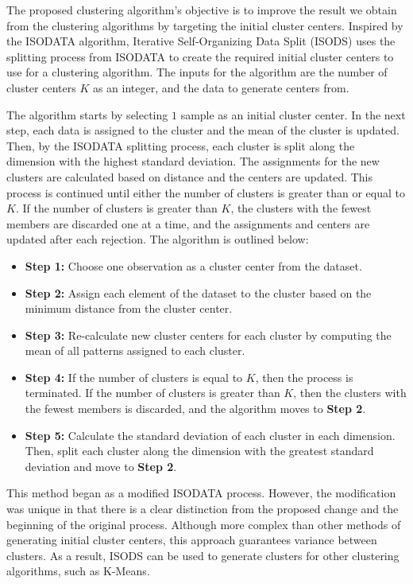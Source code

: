 \documentclass[a4paper, 10pt]{article}
\begin{document}
The proposed clustering algorithm's objective is to improve the result we obtain
from the clustering algorithms by targeting the initial cluster centers.
Inspired by the ISODATA algorithm, Iterative Self-Organizing Data Split (ISODS)
uses the splitting process from ISODATA to create the required initial cluster
centers to use for a clustering algorithm. The inputs for the algorithm are the
number of cluster centers $K$ as an integer, and the data to generate centers
from. 

The algorithm starts by selecting $1$ sample as an initial cluster center. In
the next step, each data is assigned to the cluster and the mean of the cluster
is updated. Then, by the ISODATA splitting process, each cluster is split along
the dimension with the highest standard deviation. The assignments for the new
clusters are calculated based on distance and the centers are updated. This
process is continued until either the number of clusters is greater than or
equal to $K$. If the number of clusters is greater than $K$, the clusters with
the fewest members are discarded one at a time, and the assignments and centers
are updated after each rejection. The algorithm is outlined below:

\begin{itemize}
      \item \textbf{Step 1:} Choose one observation as a cluster center from the
            dataset.
      \item \textbf{Step 2:} Assign each element of the dataset to the cluster
            based on the minimum distance from the cluster center.
      \item \textbf{Step 3:} Re-calculate new cluster centers for each cluster
            by computing the mean of all patterns assigned to each cluster.
      \item \textbf{Step 4:} If the number of clusters is equal to $K$, then the
            process is terminated. If the number of clusters is greater than
            $K$, then the clusters with the fewest members is discarded, and the
            algorithm moves to \textbf{Step 2}.
      \item \textbf{Step 5:} Calculate the standard deviation of each cluster in
            each dimension. Then, split each cluster along the dimension with
            the greatest standard deviation and move to \textbf{Step 2}.
\end{itemize}

This method began as a modified ISODATA process. However, the modification was
unique in that there is a clear distinction from the proposed change and the
beginning of the original process. Although more complex than other methods of
generating initial cluster centers, this approach guarantees variance between
clusters. As a result, ISODS can be used to generate clusters for other
clustering algorithms, such as K-Means.
\end{document}
